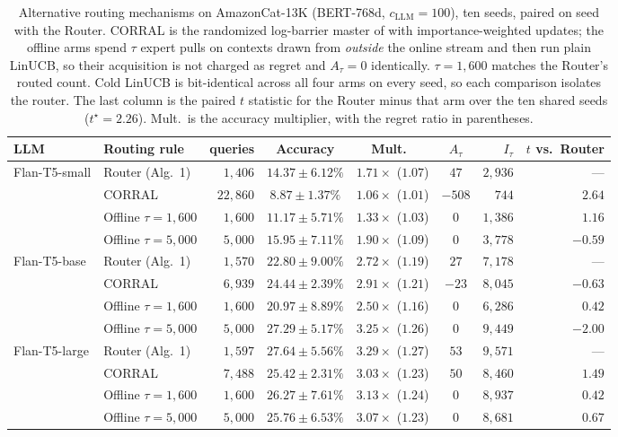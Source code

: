 \documentclass[anon]{alt2027} %
\begin{document}
\begin{table}[h]
\centering
\caption{Alternative routing mechanisms on AmazonCat-13K (BERT-768d,
$c_{\mathrm{LLM}}=100$), ten seeds, paired on seed with the Router. CORRAL is the randomized
log-barrier master of \citet{agarwal2017corralling} with importance-weighted
updates; the offline arms spend $\tau$ expert pulls on contexts drawn from
\emph{outside} the online stream and then run plain LinUCB, so their
acquisition is not charged as regret and $A_\tau=0$ identically.
$\tau=1{,}600$ matches the Router's routed count. Cold LinUCB is bit-identical
across all four arms on every seed, so each comparison isolates the router.
The last column is the paired $t$ statistic for the Router minus that arm over the
ten shared seeds ($t^\star=2.26$). Mult.\ is the accuracy multiplier, with
the regret ratio in parentheses.}
\label{tab:baselines}
\small
\setlength{\tabcolsep}{4pt}
\begin{tabular}{@{}llrcccrr@{}}
\toprule
LLM & Routing rule & queries & Accuracy & Mult.\ & $A_\tau$ & $I_\tau$ & $t$ vs.\ Router \\
\midrule
\multirow{4}{*}{Flan-T5-small}
 & Router (Alg.\ 1)    & $1{,}406$  & $14.37\pm6.12\%$ & $1.71\times$ ($1.07$) & $47$   & $2{,}936$ & --- \\
 & CORRAL            & $22{,}860$ & $8.87\pm1.37\%$  & $1.06\times$ ($1.01$) & $-508$ & $744$     & $\mathbf{2.64}$ \\
 & Offline $\tau{=}1{,}600$ & $1{,}600$ & $11.17\pm5.71\%$ & $1.33\times$ ($1.03$) & $0$ & $1{,}386$ & $1.16$ \\
 & Offline $\tau{=}5{,}000$ & $5{,}000$ & $15.95\pm7.11\%$ & $1.90\times$ ($1.09$) & $0$ & $3{,}778$ & $-0.59$ \\
\midrule
\multirow{4}{*}{Flan-T5-base}
 & Router (Alg.\ 1)    & $1{,}570$ & $22.80\pm9.00\%$ & $2.72\times$ ($1.19$) & $27$  & $7{,}178$ & --- \\
 & CORRAL            & $6{,}939$ & $24.44\pm2.39\%$ & $2.91\times$ ($1.21$) & $-23$ & $8{,}045$ & $-0.63$ \\
 & Offline $\tau{=}1{,}600$ & $1{,}600$ & $20.97\pm8.89\%$ & $2.50\times$ ($1.16$) & $0$ & $6{,}286$ & $0.42$ \\
 & Offline $\tau{=}5{,}000$ & $5{,}000$ & $27.29\pm5.17\%$ & $3.25\times$ ($1.26$) & $0$ & $9{,}449$ & $-2.00$ \\
\midrule
\multirow{4}{*}{Flan-T5-large}
 & Router (Alg.\ 1)    & $1{,}597$ & $27.64\pm5.56\%$ & $3.29\times$ ($1.27$) & $53$ & $9{,}571$ & --- \\
 & CORRAL            & $7{,}488$ & $25.42\pm2.31\%$ & $3.03\times$ ($1.23$) & $50$ & $8{,}460$ & $1.49$ \\
 & Offline $\tau{=}1{,}600$ & $1{,}600$ & $26.27\pm7.61\%$ & $3.13\times$ ($1.24$) & $0$ & $8{,}937$ & $0.42$ \\
 & Offline $\tau{=}5{,}000$ & $5{,}000$ & $25.76\pm6.53\%$ & $3.07\times$ ($1.23$) & $0$ & $8{,}681$ & $0.67$ \\
\bottomrule
\end{tabular}
\end{table}
\end{document}
